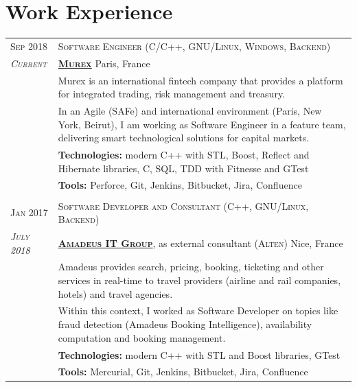 \documentclass[a4paper,10pt]{article}
\begin{document}
   \vspace{-5mm}

   \section{Work Experience}
   \begin{tabular}{p{1.7cm}|p{15.5cm}}
      \centering\textsc{Sep 2018} &
      \textsc{Software Engineer (C/C++, GNU/Linux, Windows, Backend)} \\
      \centering\emph{\textsc{Current}} &
      \textsc{\textbf{\href{https://www.murex.com/}{Murex}}}  \hfill Paris, France\\
      & Murex is an international fintech company that provides a platform for integrated trading, risk management and treasury.\\
      & In an Agile (SAFe) and international environment (Paris, New York, Beirut), I am working as Software Engineer in a feature team, delivering smart technological solutions for capital markets.\\
      & \textbf{Technologies:} modern C++ with STL, Boost, Reflect and Hibernate libraries, C, SQL, TDD with Fitnesse and GTest\\
      & \textbf{Tools:} Perforce, Git, Jenkins, Bitbucket, Jira, Confluence\\
      
      \multicolumn{2}{c}{} \\
      \centering\textsc{Jan 2017} &
      \textsc{Software Developer and Consultant (C++, GNU/Linux, Backend)} \\
      \centering\emph{\textsc{July 2018}} &
      \textsc{\textbf{\href{http://www.amadeus.com/}{Amadeus IT Group}}}, as external consultant (\textsc{Alten}) \hfill Nice, France\\
      & Amadeus provides search, pricing, booking, ticketing and other services in real-time to travel providers (airline and rail companies, hotels) and travel agencies.\\
      & Within this context, I worked as Software Developer on topics like fraud detection (Amadeus Booking Intelligence), availability computation and booking management.\\		
      & \textbf{Technologies:} modern C++ with STL and Boost libraries, GTest\\
      & \textbf{Tools:} Mercurial, Git, Jenkins, Bitbucket, Jira, Confluence\\


\end{tabular}
\end{document}

